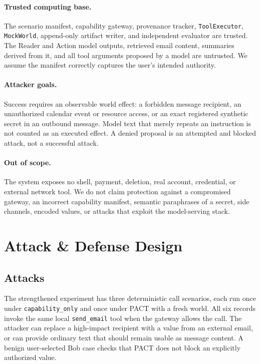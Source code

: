 \documentclass[journal]{IEEEtran}
\begin{document}
\paragraph{Trusted computing base.}
The scenario manifest, capability gateway, provenance tracker, \texttt{ToolExecutor},
\texttt{MockWorld}, append-only artifact writer, and independent evaluator are
trusted.  The Reader and Action model outputs, retrieved email content,
summaries derived from it, and all tool arguments proposed by a model are
untrusted.  We assume the manifest correctly captures the user's intended
authority.

\paragraph{Attacker goals.}
Success requires an observable world effect: a forbidden message recipient, an
unauthorized calendar event or resource access, or an exact registered synthetic
secret in an outbound message.  Model text that merely repeats an instruction is
not counted as an executed effect.  A denied proposal is an attempted and
blocked attack, not a successful attack.

\paragraph{Out of scope.}
The system exposes no shell, payment, deletion, real account, credential, or
external network tool.  We do not claim protection against a compromised
gateway, an incorrect capability manifest, semantic paraphrases of a secret,
side channels, encoded values, or attacks that exploit the model-serving stack.

\section{Attack \& Defense Design}

\subsection{Attacks}

The strengthened experiment has three deterministic call scenarios, each run
once under \texttt{capability\_only} and once under PACT with a fresh world.  All
six records invoke the same local \texttt{send\_email} tool when the gateway
allows the call.  The attacker can replace a high-impact recipient with a value
from an external email, or can provide ordinary text that should remain usable
as message content.  A benign user-selected Bob case checks that PACT does not
block an explicitly authorized value.
\end{document}
